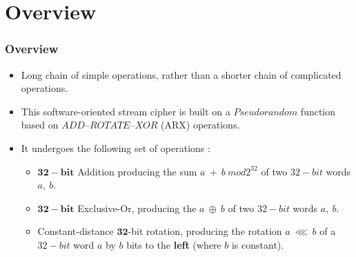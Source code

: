 \section{Overview}
\begin{frame}
	
\frametitle{Overview}
\begin{itemize}
    \item Long chain of simple operations, rather than a shorter chain of complicated operations.
    \item This software-oriented stream cipher is built on a $Pseudorandom$ function based on $ADD–ROTATE–XOR$ (ARX) operations.
    \item It undergoes the following set of operations :
    \begin{itemize} 
        \item $\mathbf{32-bit}$ Addition producing the sum $a \ + \ b \ mod 2^{32}$ of two $32-bit$ words $a, \ b$.
        \item $\mathbf{32-bit}$ Exclusive-Or, producing the $a \ \oplus \ b$ of two $32-bit$ words $a, \ b$.
        \item Constant-distance $\mathbf{32}$-bit rotation, producing the rotation $a \ \lll \ b$ of a $32-bit$ word $a$ by $b$ bits to the \textbf{left} (where $b$ is constant).
    \end{itemize}
\end{itemize}
\end{frame}